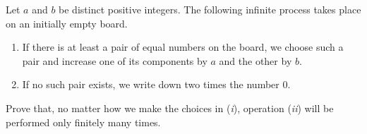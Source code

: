 Let $a$ and $b$ be distinct positive integers. The following infinite process takes place on an initially empty board.

\begin{enumerate}[label = (\textit{\roman*})]
	\item If there is at least a pair of equal numbers on the board, we choose such a pair and increase one of its components by $a$ and the other by $b$.

	\item If no such pair exists, we write down two times the number $0$. 
\end{enumerate}

Prove that, no matter how we make the choices in (\textit{i}), operation (\textit{ii}) will be performed only finitely many times.
